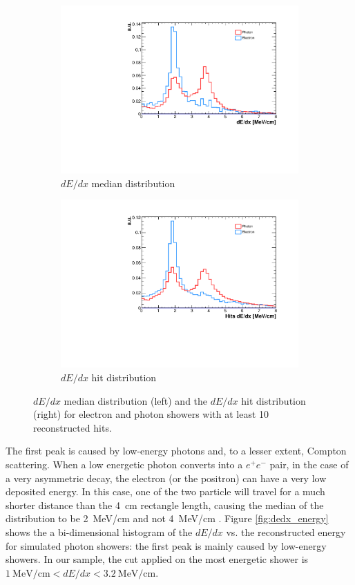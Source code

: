 \begin{figure}[htbp]
\centering
  \begin{subfigure}{0.45\textwidth}
    \includegraphics[width=\linewidth]{figures/dedx.pdf}
    \caption{$dE/dx$ median distribution} 
  \end{subfigure}
    \begin{subfigure}{0.45\textwidth}
    \includegraphics[width=\linewidth]{figures/hits_dedx.pdf}
    \caption{$dE/dx$ hit distribution} 
  \end{subfigure}
  \caption{$dE/dx$ median distribution (left) and the $dE/dx$ hit distribution (right) for electron and photon showers with at least 10 reconstructed hits.}\label{fig:dedx}
\end{figure}


The first peak is caused by low-energy photons and, to a lesser extent, Compton scattering. When a low energetic photon converts into a $e^+e^-$ pair, in the case of a very asymmetric decay, the electron (or the positron) can have a very low deposited energy. In this case, one of the two particle will travel for a much shorter distance than the 4~cm rectangle length, causing the median of the distribution to be 2~MeV/cm and not 4~MeV/cm \cite{caratelli}. Figure \ref{fig:dedx_energy} shows the a bi-dimensional histogram of the $dE/dx$ vs. the reconstructed energy for simulated photon showers: the first peak is mainly caused by low-energy showers. In our sample, the cut applied on the most energetic shower is $1~\mathrm{MeV/cm} < dE/dx < 3.2~\mathrm{MeV/cm}$.


